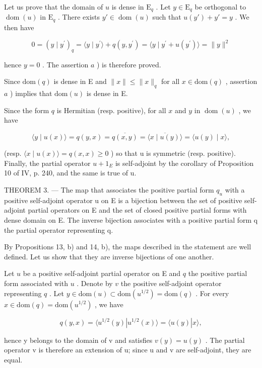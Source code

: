 Let us prove that the domain of \(u\) is dense in \(\mathrm{E}_q\) . Let \(y \in \mathrm{E}_q\) be orthogonal to \(\operatorname{dom}(u)\) in \(\mathrm{E}_q\) . There exists \(y' \in \operatorname{dom}(u)\) such that \(u(y') + y' = y\) . We then have

\[
0 = (y \mid y ^ {\prime}) _ {q} = \langle y \mid y ^ {\prime} \rangle + q (y, y ^ {\prime}) = \langle y \mid y ^ {\prime} + u (y ^ {\prime}) \rangle = \| y \| ^ {2}
\]

hence \(y = 0\) . The assertion \(a\) ) is therefore proved.

Since \(\mathrm{dom}(q)\) is dense in E and \(\| x\| \leqslant \| x\| _q\) for all \(x\in \mathrm{dom}(q)\) , assertion \(a\) ) implies that \(\mathrm{dom}(u)\) is dense in E.

Since the form \(q\) is Hermitian (resp. positive), for all \(x\) and \(y\) in \(\operatorname{dom}(u)\) , we have

\[
\langle y \mid u (x) \rangle = q (y, x) = \overline {{q (x , y)}} = \overline {{\langle x \mid u (y) \rangle}} = \langle u (y) \mid x \rangle ,
\]

(resp. \(\langle x \mid u(x) \rangle = q(x, x) \geqslant 0\) ) so that u is symmetric (resp. positive). Finally, the partial operator \(u + 1_{E}\) is self-adjoint by the corollary of Proposition 10 of IV, p. 240, and the same is true of u.

THEOREM 3. --- The map that associates the positive partial form \(q_u\) with a positive self-adjoint operator u on E is a bijection between the set of positive self-adjoint partial operators on E and the set of closed positive partial forms with dense domain on E. The inverse bijection associates with a positive partial form q the partial operator representing q.

By Propositions 13, b) and 14, b), the maps described in the statement are well defined. Let us show that they are inverse bijections of one another.

Let \(u\) be a positive self-adjoint partial operator on E and \(q\) the positive partial form associated with \(u\) . Denote by \(v\) the positive self-adjoint operator representing \(q\) . Let \(y \in \mathrm{dom}(u) \subset \mathrm{dom}(u^{1/2}) = \mathrm{dom}(q)\) . For every \(x \in \mathrm{dom}(q) = \mathrm{dom}(u^{1/2})\) , we have

\[
q (y, x) = \langle u ^ {1 / 2} (y) | u ^ {1 / 2} (x) \rangle = \langle u (y) | x \rangle ,
\]

hence y belongs to the domain of v and satisfies \(v(y) = u(y)\) . The partial operator v is therefore an extension of u; since u and v are self-adjoint, they are equal.

